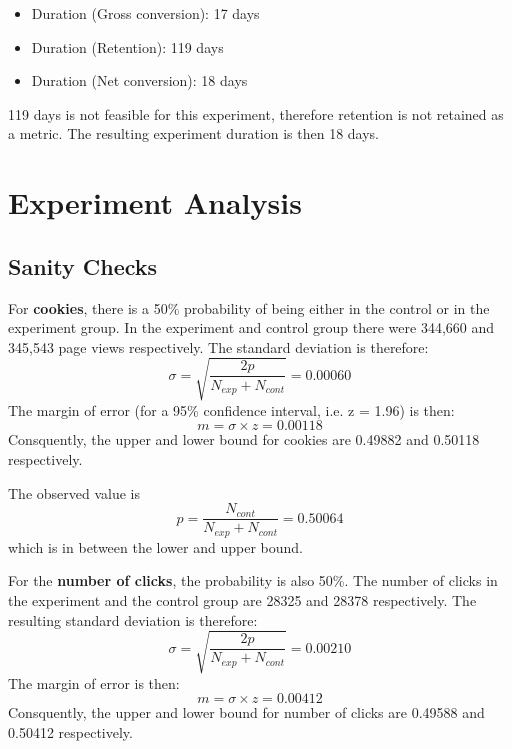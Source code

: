\documentclass[11pt]{article} %
\begin{document}
\begin{itemize}
\item Duration (Gross conversion): 17 days
\item Duration (Retention):        119 days
\item Duration (Net conversion):   18 days
\end{itemize}
119 days is not feasible for this experiment, therefore retention is not retained as a metric. The resulting experiment duration is then 18 days.

\section{Experiment Analysis}
\subsection{Sanity Checks}

For \textbf{cookies}, there is a 50\% probability of being either in the control or in the experiment group. In the experiment and control group there were 344,660 and 345,543 page views respectively. The standard deviation is therefore:
\begin{equation}
	\sigma = \sqrt{\frac{2p}{N_{exp} + N_{cont}}} = 0.00060
\end{equation}
The margin of error (for a 95\% confidence interval, i.e. z = 1.96) is then:
\begin{equation}
	m = \sigma \times z = 0.00118
\end{equation}
Consquently, the upper and lower bound for cookies are 0.49882 and 0.50118 respectively.\medskip

The observed value is 
\begin{equation}
	p = \frac{N_{cont}}{N_{exp}+N_{cont}} = 0.50064
\end{equation}
which is in between the lower and upper bound.\medskip

For the \textbf{number of clicks}, the probability is also 50\%. The number of clicks in the experiment and the control group are 28325 and 28378 respectively. The resulting standard deviation is therefore:
\begin{equation}
	\sigma = \sqrt{\frac{2p}{N_{exp} + N_{cont}}} = 0.00210
\end{equation}
The margin of error is then:
\begin{equation}
	m = \sigma \times z = 0.00412
\end{equation}
Consquently, the upper and lower bound for number of clicks are 0.49588  and 0.50412 respectively.\medskip
\end{document}
